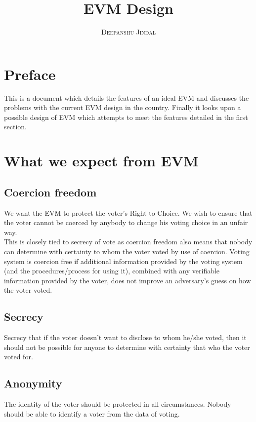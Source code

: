 \documentclass[a4paper,12pt,openany]{book}
\title{\Huge \textbf{EVM Design}}\\
\author{\textsc{Deepanshu Jindal}}\\
\begin{document}
\frontmatter
\maketitle

\tableofcontents
\mainmatter

\chapter*{Preface}
This is a document which details the features of an ideal EVM and discusses the problems with the current EVM design in the country. Finally it looks upon a possible design of EVM which attempts to meet the features detailed in the first section.
\\


\chapter{What we expect from EVM}

\section{Coercion freedom}
We want the EVM to protect the voter's Right to Choice. We wish to ensure that the voter cannot be coerced by anybody to change his voting choice in an unfair way.
\\
This is closely tied to secrecy of vote as coercion freedom also means that nobody can determine with certainty to whom the voter voted by use of coercion.   Voting  system  is  
coercion free
  if  additional information provided by the voting system  (and  the  procedures/process for using it), combined with any verifiable information  provided by the voter, does not improve an adversary’s guess on how the voter voted.

\section{Secrecy}
Secrecy that if the voter doesn't want to disclose to whom he/she voted, then it should not be possible for anyone to determine with certainty that who the voter voted for.

\section{Anonymity}
The identity of the voter should be protected in all circumstances. Nobody should be able to identify a voter from the data of voting.
\end{document}
